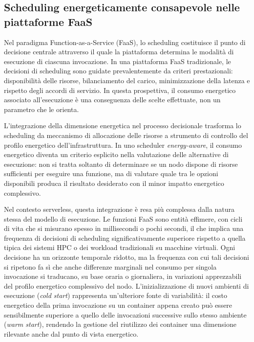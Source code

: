 \subsection{Scheduling energeticamente consapevole nelle piattaforme FaaS}
\label{subsec:energy_aware_scheduling}

Nel paradigma Function-as-a-Service (FaaS), 
lo scheduling costituisce il punto di decisione 
centrale attraverso il quale la piattaforma determina 
le modalità di esecuzione di ciascuna invocazione. 
In una piattaforma FaaS tradizionale, 
le decisioni di scheduling sono guidate prevalentemente 
da criteri prestazionali: disponibilità delle risorse, 
bilanciamento del carico, minimizzazione della latenza e 
rispetto degli accordi di servizio. 
In questa prospettiva, 
il consumo energetico associato all'esecuzione 
è una conseguenza delle scelte effettuate, 
non un parametro che le orienta.

L'integrazione della dimensione energetica 
nel processo decisionale trasforma lo scheduling 
da meccanismo di allocazione delle risorse a 
strumento di controllo del profilo energetico 
dell'infrastruttura. 
In uno scheduler \emph{energy-aware}, 
il consumo energetico diventa un criterio 
esplicito nella valutazione delle alternative 
di esecuzione: non si tratta soltanto di determinare 
se un nodo dispone di risorse sufficienti per eseguire 
una funzione, ma di valutare quale tra le opzioni disponibili 
produca il risultato desiderato con il minor impatto 
energetico complessivo.

Nel contesto serverless, 
questa integrazione è resa più complessa 
dalla natura stessa del modello di esecuzione. 
Le funzioni FaaS sono entità effimere, 
con cicli di vita che si misurano spesso 
in millisecondi o pochi secondi, 
il che implica una frequenza di decisioni 
di scheduling significativamente superiore 
rispetto a quella tipica dei sistemi HPC o 
dei workload tradizionali su macchine virtuali. 
Ogni decisione ha un orizzonte temporale ridotto, 
ma la frequenza con cui tali decisioni si ripetono 
fa sì che anche differenze marginali nel consumo 
per singola invocazione si traducano, su base oraria 
o giornaliera, in variazioni apprezzabili del profilo 
energetico complessivo del nodo. 
L'inizializzazione di nuovi ambienti di esecuzione 
(\emph{cold start}) rappresenta un'ulteriore fonte di 
variabilità: il costo energetico della prima invocazione 
su un container appena creato può essere sensibilmente 
superiore a quello delle invocazioni successive sullo 
stesso ambiente (\emph{warm start}), rendendo la gestione 
del riutilizzo dei container una dimensione rilevante 
anche dal punto di vista energetico.

